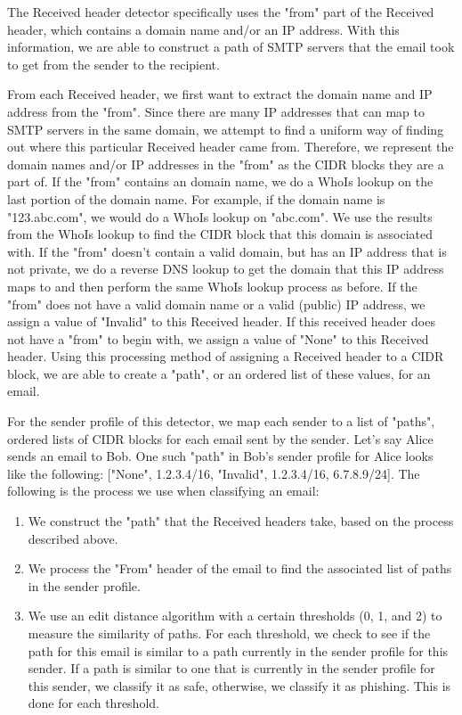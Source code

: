 \documentclass[letterpaper]{article}
\begin{document}
The Received header detector specifically uses the "from" part of the Received header, which contains a domain name and/or an IP address. With this information, we are able to construct a path of SMTP servers that the email took to get from the sender to the recipient. 

From each Received header, we first want to extract the domain name and IP address from the "from". Since there are many IP addresses that can map to SMTP servers in the same domain, we attempt to find a uniform way of finding out where this particular Received header came from. Therefore, we represent the domain names and/or IP addresses in the "from" as the CIDR blocks they are a part of. If the "from" contains an domain name, we do a WhoIs lookup on the last portion of the domain name. For example, if the domain name is "123.abc.com", we would do a WhoIs lookup on "abc.com". We use the results from the WhoIs lookup to find the CIDR block that this domain is associated with. If the "from" doesn't contain a valid domain, but has an IP address that is not private, we do a reverse DNS lookup to get the domain that this IP address maps to and then perform the same WhoIs lookup process as before. If the "from" does not have a valid domain name or a valid (public) IP address, we assign a value of "Invalid" to this Received header. If this received header does not have a "from" to begin with, we assign a value of "None" to this Received header. Using this processing method of assigning a Received header to a CIDR block, we are able to create a "path", or an ordered list of these values, for an email. 

For the sender profile of this detector, we map each sender to a list of "paths", ordered lists of CIDR blocks for each email sent by the sender. Let's say Alice sends an email to Bob. One such "path" in Bob's sender profile for Alice looks like the following: ["None", 1.2.3.4/16, "Invalid", 1.2.3.4/16, 6.7.8.9/24]. The following is the process we use when classifying an email:

\begin{enumerate}
\item We construct the "path" that the Received headers take, based on the process described above.
\item We process the "From" header of the email to find the associated list of paths in the sender profile.
\item We use an edit distance algorithm with a certain thresholds (0, 1, and 2) to measure the similarity of paths. For each threshold, we check to see if the path for this email is similar to a path currently in the sender profile for this sender. If a path is similar to one that is currently in the sender profile for this sender, we classify it as safe, otherwise, we classify it as phishing. This is done for each threshold. 
\end{enumerate}
\end{document}
